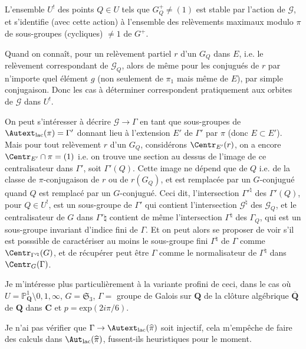 L'ensemble $U^!$ des points $Q \in U$ tels que $G^+_Q \neq (1)$ est stable par l'action de $\mathcal{G}$, et s'identifie (avec cette action) à l'ensemble des relèvements maximaux modulo $\pi$ de sous-groupes (cycliques) $\neq 1$ de $G^+$.

Quand on connaît, pour un relèvement partiel $r$ d'un $G_Q$ dans $E$, i.e. le relèvement correspondant de $\mathcal{G}_Q$, alors de même pour les conjugués de $r$ par n'importe quel élément $g$ (non seulement de $\pi_1$ mais même de $E$), par simple conjugaison. Donc les cas à déterminer correspondent pratiquement aux orbites de $\mathcal{G}$ dans $U^!$. 

On peut s'intéresser à décrire $\mathcal{G} \to \Gamma$ en tant que sous-groupes de $\Autext_{\text{lac}}(\pi) = \Gamma'$ donnant lieu à l'extension $E'$ de $\Gamma'$ par $\pi$ (donc $E \subset  E'$). Mais pour tout relèvement $r$ d'un $G_Q$, considérons $\Centr_{E'}(r)$, on a encore $\Centr_{E'} \cap \pi = (1)$ i.e. on trouve une section au dessus de l'image de ce centralisateur dans $\Gamma'$, soit $\Gamma'(Q)$. Cette image ne dépend que de $Q$ i.e. de la classe de $\pi$-conjugaison de $r$ ou de $r(G_Q)$, et est remplacée par un $G$-conjugué quand $Q$ est remplacé par un $G$-conjugué. Ceci dit, l'intersection $\Gamma'^\natural$ des $\Gamma'(Q)$, pour $Q \in U^!$, est un sous-groupe de $\Gamma'$ qui contient l'intersection $\mathcal{G}^\natural$ des $\mathcal{G}_Q$, et le centralisateur de $G$ dans $\Gamma'\natural$ contient de même l'intersection $\Gamma^\natural$ des $\Gamma_Q$, qui est un sous-groupe invariant d'indice fini de $\Gamma$. Et on peut alors se proposer de voir s'il est posssible de caractériser au moins le sous-groupe fini $\Gamma^\natural$ de $\Gamma$ comme $\Centr_{\Gamma'^\natural}(G)$, et de récupérer peut être $\Gamma$ comme le normalisateur de $\Gamma^\natural$ dans $\Centr_G(\Gamma)$.

Je m'intéresse plus particulièrement à la variante profini de ceci, dans le cas où $U = \mathbb{P}^1_{\mathbf{Q}} \setminus {0, 1, \infty}$, $G = \mathfrak{S}_3$, $\Gamma =$ groupe de Galois sur $\mathbf{Q}$ de la clôture algébrique $\overline{\mathbf{Q}}$ de $\mathbf{Q}$ dans $\mathbf{C}$ et $p = \text{exp}(2i\pi/6)$.

Je n'ai pas vérifier que $\Gamma \to \Autext_{\text{lac}}(\widehat{\pi})$ soit injectif, cela m'empêche de faire des calculs dans $\Aut_{\text{lac}}(\widehat{\pi})$, fussent-ils heuristiques pour le moment.

